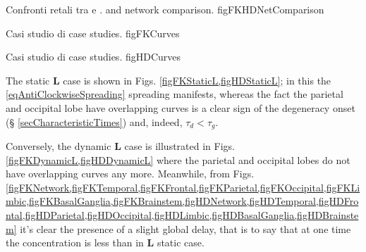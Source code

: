\documentclass{article}
\begin{document}
                    {}
                    {\selezionaLingua
                        {Confronti retali tra \FKdiscrete{} e \HDdiscrete{}.}
                        {\FKdiscrete{} and \HDdiscrete{} network comparison.}}
                    {\linewidth}
                    {figFKHDNetComparison}


                    {}
                    {\selezionaLingua
                        {Casi studio di \FKdiscrete{}}
                        {\FKdiscrete{} case studies}.}
                    {\linewidth}
                    {figFKCurves}

                    {}
                    {\selezionaLingua
                        {Casi studio di \HDdiscrete{}}
                        {\HDdiscrete{} case studies}.}
                    {\linewidth}
                    {figHDCurves}



                The static $\mathbf L$ case is shown in Figs. \cref{figFKStaticL,figHDStaticL}; in this the \eqref{eqAntiClockwiseSpreading} spreading manifests, whereas the fact the parietal and occipital lobe have overlapping curves is a clear sign of the degeneracy onset (§ \ref{secCharacteristicTimes}) and, indeed, $\tau_d<\tau_g$.

                Conversely, the dynamic $\mathbf L$ case is illustrated in Figs. \cref{figFKDynamicL,figHDDynamicL} where the parietal and occipital lobes do not have overlapping curves any more. Meanwhile, from Figs. \cref{figFKNetwork,figFKTemporal,figFKFrontal,figFKParietal,figFKOccipital,figFKLimbic,figFKBasalGanglia,figFKBrainstem,figHDNetwork,figHDTemporal,figHDFrontal,figHDParietal,figHDOccipital,figHDLimbic,figHDBasalGanglia,figHDBrainstem} it's clear the presence of a slight global delay, that is to say that at one time the concentration is less than in $\mathbf L$ static case.
\end{document}
